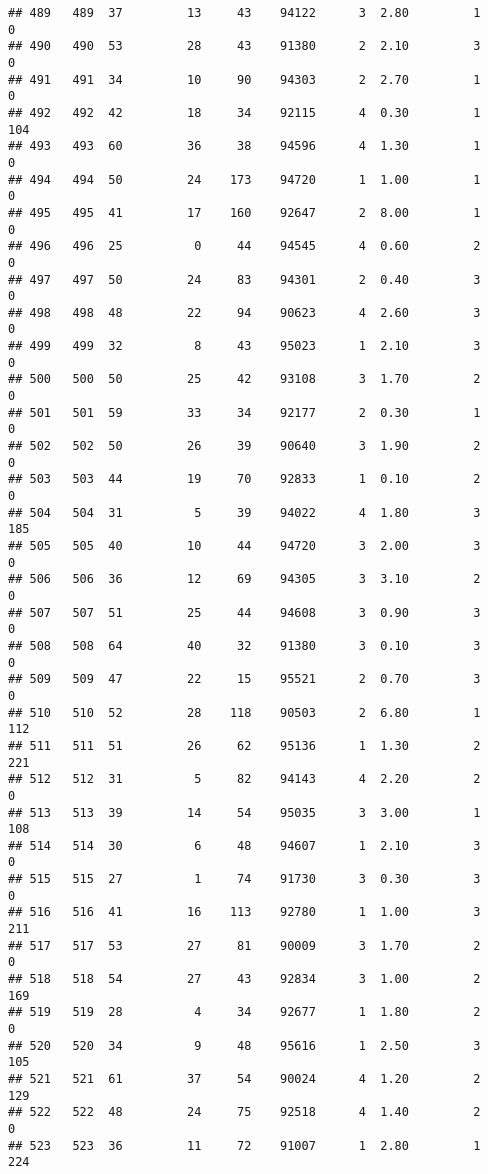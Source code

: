 \documentclass[
]{article}
\begin{document}
\begin{verbatim}
## 489   489  37         13     43    94122      3  2.80         1        0
## 490   490  53         28     43    91380      2  2.10         3        0
## 491   491  34         10     90    94303      2  2.70         1        0
## 492   492  42         18     34    92115      4  0.30         1      104
## 493   493  60         36     38    94596      4  1.30         1        0
## 494   494  50         24    173    94720      1  1.00         1        0
## 495   495  41         17    160    92647      2  8.00         1        0
## 496   496  25          0     44    94545      4  0.60         2        0
## 497   497  50         24     83    94301      2  0.40         3        0
## 498   498  48         22     94    90623      4  2.60         3        0
## 499   499  32          8     43    95023      1  2.10         3        0
## 500   500  50         25     42    93108      3  1.70         2        0
## 501   501  59         33     34    92177      2  0.30         1        0
## 502   502  50         26     39    90640      3  1.90         2        0
## 503   503  44         19     70    92833      1  0.10         2        0
## 504   504  31          5     39    94022      4  1.80         3      185
## 505   505  40         10     44    94720      3  2.00         3        0
## 506   506  36         12     69    94305      3  3.10         2        0
## 507   507  51         25     44    94608      3  0.90         3        0
## 508   508  64         40     32    91380      3  0.10         3        0
## 509   509  47         22     15    95521      2  0.70         3        0
## 510   510  52         28    118    90503      2  6.80         1      112
## 511   511  51         26     62    95136      1  1.30         2      221
## 512   512  31          5     82    94143      4  2.20         2        0
## 513   513  39         14     54    95035      3  3.00         1      108
## 514   514  30          6     48    94607      1  2.10         3        0
## 515   515  27          1     74    91730      3  0.30         3        0
## 516   516  41         16    113    92780      1  1.00         3      211
## 517   517  53         27     81    90009      3  1.70         2        0
## 518   518  54         27     43    92834      3  1.00         2      169
## 519   519  28          4     34    92677      1  1.80         2        0
## 520   520  34          9     48    95616      1  2.50         3      105
## 521   521  61         37     54    90024      4  1.20         2      129
## 522   522  48         24     75    92518      4  1.40         2        0
## 523   523  36         11     72    91007      1  2.80         1      224

\end{verbatim}
\end{document}
